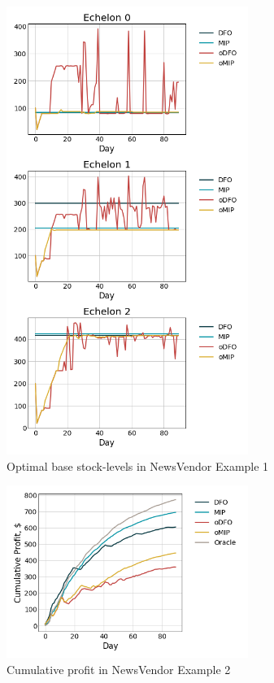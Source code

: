 \documentclass[12pt]{article}
\begin{document}
\begin{figure}[!htbp]
    \centering
    \includegraphics[width=0.7\textwidth]{NewsVendor_Backlog_zopt.png}
    \caption{Optimal base stock-levels in NewsVendor Example 1}
    \label{fig:NV_backlog_basestock}
\end{figure}

\begin{figure}[!h]
    \centering
    \includegraphics[width=0.7\textwidth]{NewsVendor_LostSales.png}
    \caption{Cumulative profit in NewsVendor Example 2}
    \label{fig:NV_LostSales}
\end{figure}
\end{document}
